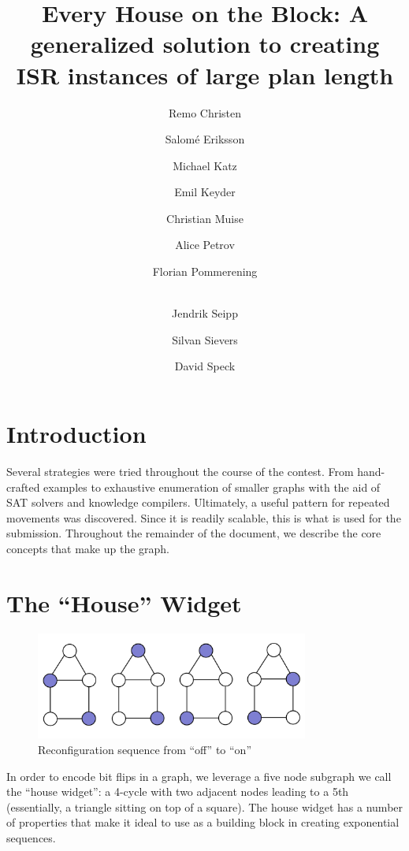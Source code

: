 \documentclass{article}
\date{}
\title{Every House on the Block: A generalized solution to creating ISR instances of large plan length}
\author[1]{Remo Christen}
\author[1]{Salomé Eriksson}
\author[2]{Michael Katz}
\author[3]{Emil Keyder}
\author[4]{Christian Muise}
\author[4]{Alice Petrov}
\author[1]{Florian Pommerening}
\author[5]{\\ Jendrik Seipp}
\author[1]{Silvan Sievers}
\author[6]{David Speck}
\affil[1]{University of Basel}
\affil[2]{IBM T.J. Watson Research Center}
\affil[3]{Invitae}
\affil[4]{Queen's University}
\affil[5]{Linköping University}
\affil[6]{University of Freiburg}
\begin{document}
\maketitle


\section{Introduction}

Several strategies were tried throughout the course of the contest. From hand-crafted examples to exhaustive enumeration of smaller graphs with the aid of SAT solvers and knowledge compilers. Ultimately, a useful pattern for repeated movements was discovered. Since it is readily scalable, this is what is used for the submission. Throughout the remainder of the document, we describe the core concepts that make up the graph.


\section{The ``House'' Widget}

\begin{figure}[ht]
\centering
\includegraphics[width=0.8\textwidth]{house-widget.jpg}
\caption{\label{fig:house-widget}Reconfiguration sequence from ``off'' to ``on''}
\end{figure}

In order to encode bit flips in a graph, we leverage a five node subgraph we call the ``house widget'': a 4-cycle with two adjacent nodes leading to a 5th (essentially, a triangle sitting on top of a square). The house widget has a number of properties that make it ideal to use as a building block in creating exponential sequences.
\end{document}
